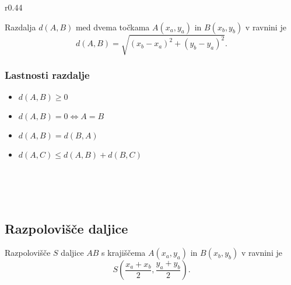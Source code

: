 \begin{wrapfigure}{r}{0.44\textwidth}
                        
            \end{wrapfigure}
        
            Razdalja $d(A,B)$ med dvema točkama $A(x_a,y_a)$ in $B(x_b,y_b)$ v ravnini je
            $$ d(A,B)=\sqrt{(x_b-x_a)^2+(y_b-y_a)^2}. $$
        

        \subsubsection*{Lastnosti razdalje}
            \begin{itemize}
                \item $d(A,B)\geq 0$
                \item $d(A,B)=0\Leftrightarrow A=B$
                \item $d(A,B)=d(B,A)$
                \item $d(A,C)\leq d(A,B)+d(B,C)$
            \end{itemize}

            ~\\~\\~
    
    
        \subsection*{Razpolovišče daljice}
        
                Razpolovišče $S$ daljice $AB$ s krajiščema $A(x_a,y_a)$ in $B(x_b,y_b)$ v ravnini je
                $$ S\left(\dfrac{x_a+x_b}{2},\dfrac{y_a+y_b}{2}\right). $$
            

                    
